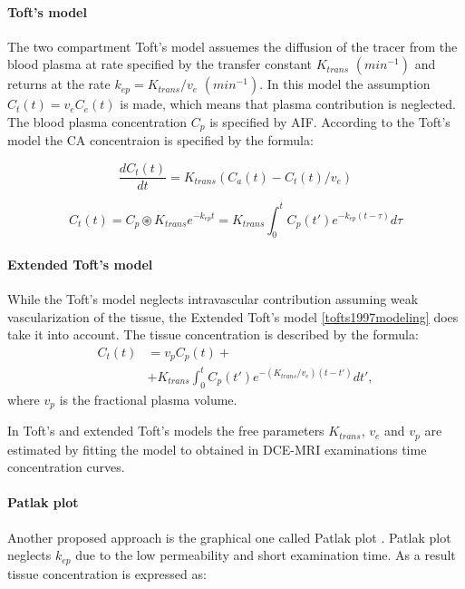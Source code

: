 \paragraph{Toft's model}


The two compartment Toft's model \cite{tofts1991measurement} assuemes the diffusion of the tracer from the blood plasma at rate specified by the transfer constant $K_{trans}$ $(min^{-1})$ and returns at the rate $k_{ep} = K_{trans}/v_e$ $(min^{-1})$. In this model the assumption $C_t(t) = v_eC_e(t)$ is made, which means that plasma contribution is neglected. The blood plasma concentration $C_p$ is specified by AIF. According to the Toft's model the CA concentraion is specified by the formula:
 
\begin{equation}
	\label{eq:toft}
	\frac{dC_{t}(t)}{dt} = K_{trans}(C_a(t)-C_t(t)/v_e)
\end{equation} 
 
\begin{equation}
	\label{eq:toft2}
	C_{t}(t) =C_p\circledast K_{trans}e^{-k_{ep}t} =K_{trans}\int_{0}^{t}C_p(t')e^{-k_{ep}(t-\tau)}d\tau  
\end{equation}

\paragraph{Extended Toft's model}
While the Toft's model neglects intravascular contribution assuming weak vascularization of the tissue, the Extended Toft's model \ref{tofts1997modeling} does take it into account. The tissue concentration is described by the formula:
\begin{align}
	\label{eq:extended_toft}
	\nonumber C_{t}(t) &= v_pC_p(t)+\\ 
	&+ K_{trans}\int_{0}^{t}C_p(t')e^{-(K_{trans}/v_e)(t-t')}dt', 
\end{align}
where $v_p$ is the fractional plasma volume. 

In Toft's and extended Toft's models the free parameters $K_{trans}$, $v_e$ and $v_p$ are estimated by fitting the model to obtained in DCE-MRI examinations time concentration curves.  

\paragraph{Patlak plot}
Another proposed approach is the graphical one called Patlak plot \cite{patlak1983graphical}. Patlak plot neglects $k_{ep}$ due to the low permeability and short examination time. As a result tissue concentration is expressed as:


